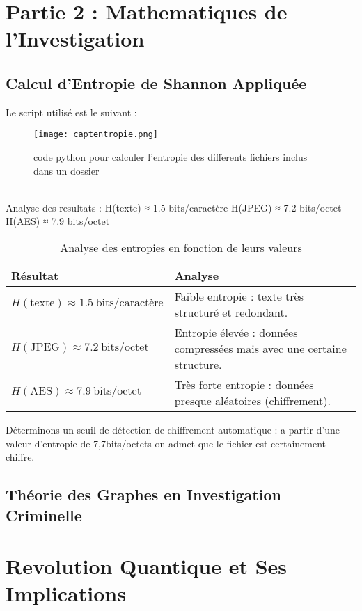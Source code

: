 \documentclass[11pt,a4paper]{article}
\begin{document}
\section{Partie 2 : Mathematiques de l'Investigation}


\subsection{Calcul d’Entropie de Shannon Appliquée}

Le script utilisé est le suivant :\\

\begin{figure}[H]
    \centering
    \texttt{[image: captentropie.png]} 
    \caption{code python pour calculer l'entropie des differents fichiers inclus dans un dossier}
    \label{fig:captentropie}
\end{figure}

\\
Analyse des resultats : H(texte) ≈ 1.5 bits/caractère
H(JPEG) ≈ 7.2 bits/octet
H(AES) ≈ 7.9 bits/octet

\begin{table}[H]
\centering
\begin{tabular}{|l|l|}
\hline
\textbf{Résultat} & \textbf{Analyse} \\ 
\hline
$H(\text{texte}) \approx 1.5~\text{bits/caractère}$ & Faible entropie : texte très structuré et redondant. \\ 
\hline
$H(\text{JPEG}) \approx 7.2~\text{bits/octet}$ & Entropie élevée : données compressées mais avec une certaine structure. \\ 
\hline
$H(\text{AES}) \approx 7.9~\text{bits/octet}$ & Très forte entropie : données presque aléatoires (chiffrement). \\ 
\hline
\end{tabular}
\caption{Analyse des entropies en fonction de leurs valeurs}
\label{tab:entropie}
\end{table}

Déterminons un seuil de détection de chiffrement automatique : a partir d'une valeur d'entropie de 7,7bits/octets on admet que le fichier est certainement chiffre.

\subsection{Théorie des Graphes en Investigation Criminelle}

\section{Revolution Quantique et Ses Implications}
\end{document}
